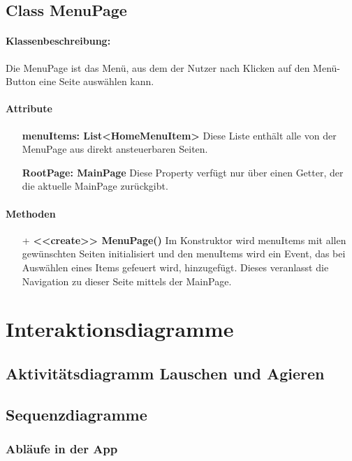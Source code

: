 \documentclass[a4paper,12pt]{article}
\begin{document}
	\subsection{Class MenuPage}
		\paragraph{Klassenbeschreibung:}
		Die MenuPage ist das Menü, aus dem der Nutzer nach Klicken auf den Menü-Button eine Seite auswählen kann.
		\paragraph{Attribute}
		\begin{itemize}
			\item [] \textbf{menuItems: List<HomeMenuItem>} Diese Liste enthält alle von der MenuPage aus direkt ansteuerbaren Seiten.
			\item [] \textbf{RootPage: MainPage} Diese Property verfügt nur über einen Getter, der die aktuelle MainPage zurückgibt.
		\end{itemize}
		\paragraph{Methoden}
		\begin{itemize}
			\item [+] \textbf{<<create>> MenuPage()} Im Konstruktor wird menuItems mit allen gewünschten Seiten initialisiert und den menuItems wird ein Event, das bei Auswählen eines Items gefeuert wird, hinzugefügt. Dieses veranlasst die Navigation zu dieser Seite mittels der MainPage.
		\end{itemize}
\section{Interaktionsdiagramme}
\subsection{Aktivitätsdiagramm Lauschen und Agieren}
\subsection{Sequenzdiagramme}


\subsubsection{Abläufe in der App}
\end{document}
